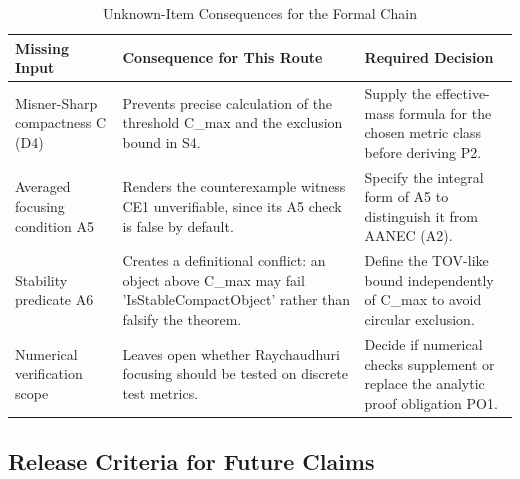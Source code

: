 \documentclass[conference]{IEEEtran}
\begin{document}
\begin{table}[htbp]
\centering
\footnotesize
\setlength{\tabcolsep}{3pt}
\renewcommand{\arraystretch}{1.12}
\caption{Unknown-Item Consequences for the Formal Chain}
\label{tab:appendix-evidence-and-review-unknown-consequences}
\begin{tabular}{|p{}|p{}|p{}|}
\hline
Missing Input & Consequence for This Route & Required Decision \\\hline
Misner-Sharp compactness C (D4) & Prevents precise calculation of the threshold C\_max and the exclusion bound in S4. & Supply the effective-mass formula for the chosen metric class before deriving P2. \\\hline
Averaged focusing condition A5 & Renders the counterexample witness CE1 unverifiable, since its A5 check is false by default. & Specify the integral form of A5 to distinguish it from AANEC (A2). \\\hline
Stability predicate A6 & Creates a definitional conflict: an object above C\_max may fail 'IsStableCompactObject' rather than falsify the theorem. & Define the TOV-like bound independently of C\_max to avoid circular exclusion. \\\hline
Numerical verification scope & Leaves open whether Raychaudhuri focusing should be tested on discrete test metrics. & Decide if numerical checks supplement or replace the analytic proof obligation PO1. \\\hline
\end{tabular}
\end{table}

\subsection{Release Criteria for Future Claims}
\end{document}
